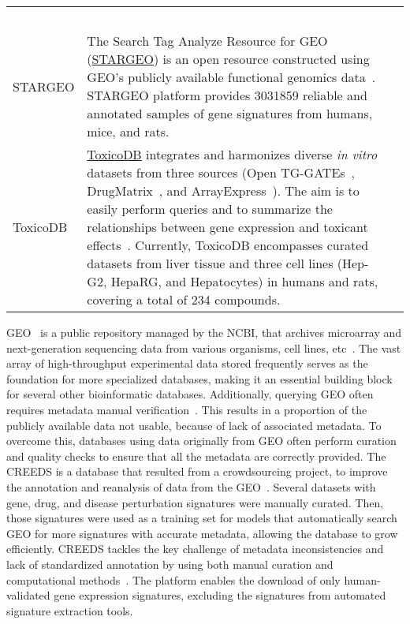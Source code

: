 \begin{newpdflayout}{210mm}{297mm}
\begin{center}
\begin{longtable}{@{} p{} p{} p{} @{}}
  ~\cite{RN88} \\
STARGEO &
  The Search Tag Analyze Resource for GEO (\href{http://stargeo.org/}{STARGEO}) is an open resource constructed using \gls{GEO}'s publicly available functional genomics data~\cite{RN98}. STARGEO platform provides 3031859 reliable and annotated samples of gene signatures from humans, mice, and rats. &
  ~\cite{RN127} \\
ToxicoDB &
  \href{http://www.toxicodb.ca/}{ToxicoDB} integrates and harmonizes diverse \textit{in vitro} datasets from three sources (Open TG-GATEs~\cite{RN120}, DrugMatrix~\cite{RN102}, and ArrayExpress~\cite{RN122}). The aim is to easily perform queries and to summarize the relationships between gene expression and toxicant effects~\cite{RN128}. Currently, ToxicoDB encompasses curated datasets from liver tissue and three cell lines (Hep-G2, HepaRG, and Hepatocytes) in humans and rats, covering a total of 234 compounds. &
  ~\cite{RN128} \\
\end{longtable}
\end{center}

\end{newpdflayout}

\gls{GEO}~\cite{RN98} is a public repository managed by the \gls{NCBI}, that archives microarray and next-generation sequencing data from various organisms, cell lines, etc~\cite{RN89}. The vast array of high-throughput experimental data stored frequently serves as the foundation for more specialized databases, making it an essential building block for several other bioinformatic databases. Additionally, querying \gls{GEO} often requires metadata manual verification~\cite{RN115}. This results in a proportion of the publicly available data not usable, because of lack of associated metadata. 
To overcome this, databases using data originally from \gls{GEO} often perform curation and quality checks to ensure that all the metadata are correctly provided. 
The \gls{CREEDS} is a database that resulted from a crowdsourcing project, to improve the annotation and reanalysis of data from the \gls{GEO}~\cite{RN87}. 
Several datasets with gene, drug, and disease perturbation signatures were manually curated. Then, those signatures were used as a training set for models that automatically search GEO for more signatures with accurate metadata, allowing the database to grow efficiently. \gls{CREEDS} tackles the key challenge of metadata inconsistencies and lack of standardized annotation by using both manual curation and computational methods~\cite{RN87}. The platform enables the download of only human-validated gene expression signatures, excluding the signatures from automated signature extraction tools.

